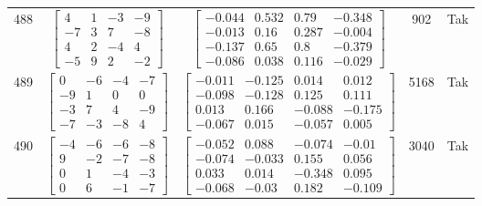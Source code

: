 \documentclass[a4paper,12pt]{article}
\begin{document}
\begin{tabular}{c c c c c}
488
&
$\begin{bmatrix} 4 & 1 & -3 & -9 \\ -7 & 3 & 7 & -8 \\ 4 & 2 & -4 & 4 \\ -5 & 9 & 2 & -2 \end{bmatrix}$
&
$\begin{bmatrix} -0.044 & 0.532 & 0.79 & -0.348 \\ -0.013 & 0.16 & 0.287 & -0.004 \\ -0.137 & 0.65 & 0.8 & -0.379 \\ -0.086 & 0.038 & 0.116 & -0.029 \end{bmatrix}$
&
902
&
Tak
\\
489
&
$\begin{bmatrix} 0 & -6 & -4 & -7 \\ -9 & 1 & 0 & 0 \\ -3 & 7 & 4 & -9 \\ -7 & -3 & -8 & 4 \end{bmatrix}$
&
$\begin{bmatrix} -0.011 & -0.125 & 0.014 & 0.012 \\ -0.098 & -0.128 & 0.125 & 0.111 \\ 0.013 & 0.166 & -0.088 & -0.175 \\ -0.067 & 0.015 & -0.057 & 0.005 \end{bmatrix}$
&
5168
&
Tak
\\
490
&
$\begin{bmatrix} -4 & -6 & -6 & -8 \\ 9 & -2 & -7 & -8 \\ 0 & 1 & -4 & -3 \\ 0 & 6 & -1 & -7 \end{bmatrix}$
&
$\begin{bmatrix} -0.052 & 0.088 & -0.074 & -0.01 \\ -0.074 & -0.033 & 0.155 & 0.056 \\ 0.033 & 0.014 & -0.348 & 0.095 \\ -0.068 & -0.03 & 0.182 & -0.109 \end{bmatrix}$
&
3040
&
Tak
\\
\end{tabular} \egroup \newpage
\end{document}

